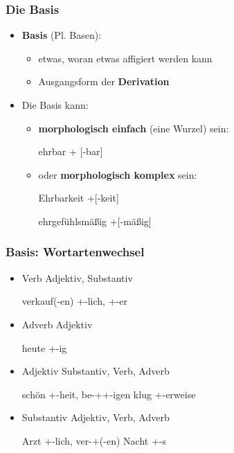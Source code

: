 \begin{frame}
\frametitle{Die Basis}

\begin{itemize}
	\item \textbf{Basis} (Pl. Basen):
	
	\begin{itemize}
		\item etwas, woran etwas affigiert werden kann
		\item Ausgangsform der \textbf{Derivation}
	\end{itemize}
	
	\item Die Basis kann:
	
	\begin{itemize}
		\item \textbf{morphologisch einfach} (eine Wurzel) sein:
		
		\ea ehrbar \ras  [ehr] + [-bar]
		\z
		
		\item oder \textbf{morphologisch komplex} sein:


		\settowidth{} 		
		\ea Ehrbarkeit \ras  \alertred{[[Ehr]+[-bar]]}+[-keit] 

		\ex ehrgefühlsmäßig \ras  \alertred{[[ehr]+[gefühl(s)]]}+[-mäßig]  
		\z
		
	\end{itemize}
	
\end{itemize}


\end{frame}




\begin{frame}
\frametitle{Basis: Wortartenwechsel}

	\begin{itemize}
		\item Verb \ras Adjektiv, Substantiv
		
		\ea verkauf(-en) \ras {}+-lich, +-er
		\z
		
		\item Adverb \ras Adjektiv
		
		\ea heute \ras {}+-ig
		\z
		
		\item Adjektiv \ras Substantiv, Verb, Adverb
		
		\eal 
			\ex schön \ras {}+-heit, be-++-igen
			\ex klug \ras {}+-erweise
		\zl
		
		\item Substantiv \ras Adjektiv, Verb, Adverb

		\eal 
			\ex Arzt \ras {}+-lich, ver-+(-en)
			\ex Nacht \ras {}+-s
		\zl
		
	\end{itemize}
	
\end{frame}



